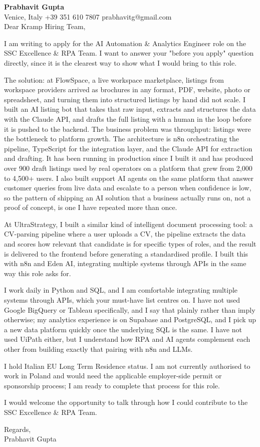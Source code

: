 \documentclass[a4paper,10.5pt]{article}
\begin{document}
\textbf{Prabhavit Gupta}\\
Venice, Italy \textbar{} +39 351 610 7807 \textbar{} prabhavitg@gmail.com\\[10pt]
Dear Kramp Hiring Team,

I am writing to apply for the AI Automation \& Analytics Engineer role on the SSC Excellence \& RPA Team. I want to answer your "before you apply" question directly, since it is the clearest way to show what I would bring to this role.

The solution: at FlowSpace, a live workspace marketplace, listings from workspace providers arrived as brochures in any format, PDF, website, photo or spreadsheet, and turning them into structured listings by hand did not scale. I built an AI listing bot that takes that raw input, extracts and structures the data with the Claude API, and drafts the full listing with a human in the loop before it is pushed to the backend. The business problem was throughput: listings were the bottleneck to platform growth. The architecture is n8n orchestrating the pipeline, TypeScript for the integration layer, and the Claude API for extraction and drafting. It has been running in production since I built it and has produced over 900 draft listings used by real operators on a platform that grew from 2,000 to 4,500+ users. I also built support AI agents on the same platform that answer customer queries from live data and escalate to a person when confidence is low, so the pattern of shipping an AI solution that a business actually runs on, not a proof of concept, is one I have repeated more than once.

At UltraStrategy, I built a similar kind of intelligent document processing tool: a CV-parsing pipeline where a user uploads a CV, the pipeline extracts the data and scores how relevant that candidate is for specific types of roles, and the result is delivered to the frontend before generating a standardised profile. I built this with n8n and Eden AI, integrating multiple systems through APIs in the same way this role asks for.

I work daily in Python and SQL, and I am comfortable integrating multiple systems through APIs, which your must-have list centres on. I have not used Google BigQuery or Tableau specifically, and I say that plainly rather than imply otherwise; my analytics experience is on Supabase and PostgreSQL, and I pick up a new data platform quickly once the underlying SQL is the same. I have not used UiPath either, but I understand how RPA and AI agents complement each other from building exactly that pairing with n8n and LLMs.

I hold Italian EU Long Term Residence status. I am not currently authorised to work in Poland and would need the applicable employer-side permit or sponsorship process; I am ready to complete that process for this role.

I would welcome the opportunity to talk through how I could contribute to the SSC Excellence \& RPA Team.

Regards,\\
Prabhavit Gupta
\end{document}
